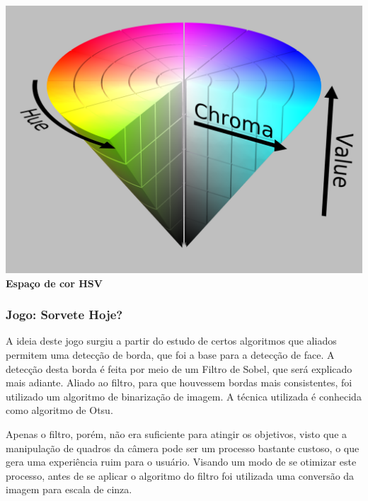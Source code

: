 \documentclass[a4paper]{article}
\begin{document}
\vspace{5.00mm}

\begin{center}
\includegraphics[scale=0.08]{hsv.png} \\
\textbf{\normalsize Espaço de cor HSV}
\end{center}
\vspace{5.00mm}


\begin{flushleft}
\subsubsection{Jogo: Sorvete Hoje?}
\end{flushleft}


A ideia deste jogo surgiu a partir do estudo de certos algoritmos que aliados permitem uma detecção de borda, que foi a base para a detecção de face. A detecção desta borda é feita por meio de um Filtro de Sobel, que será explicado mais adiante. Aliado ao filtro, para que houvessem bordas mais consistentes, foi utilizado um algoritmo de binarização de imagem. A técnica utilizada é conhecida como algoritmo de Otsu.

Apenas o filtro, porém, não era suficiente para atingir os objetivos, visto que a manipulação de quadros da câmera pode ser um processo bastante custoso, o que gera uma experiência ruim para o usuário. Visando um modo de se otimizar este processo, antes de se aplicar o algoritmo do filtro foi utilizada uma conversão da imagem para escala de cinza.
\end{document}

